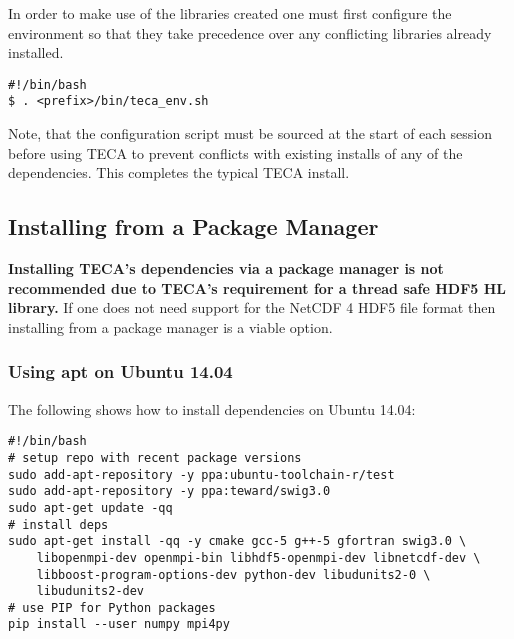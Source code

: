 \documentclass[a4paper,10pt,DIV=12]{scrreprt}
\begin{document}
\noindent In order to make use of the libraries created one
must first configure the environment so that they take precedence over any
conflicting libraries already installed.

\vspace{2mm}\hspace{0.2in}\begin{minipage}{0.8\textwidth}
\begin{verbatim}
#!/bin/bash
$ . <prefix>/bin/teca_env.sh
\end{verbatim}
\end{minipage}\vspace{2mm}

\noindent Note, that the configuration script must be sourced at the start of
each session before using TECA to prevent conflicts with existing installs of
any of the dependencies. This completes the typical TECA install.

\subsection{Installing from a Package Manager}
\textbf{ \color{red} Installing TECA's dependencies via a package manager is not
recommended due to TECA's requirement for a thread safe HDF5 HL library.} If one
does not need support for the NetCDF 4 HDF5 file format then installing from a
package manager is a viable option.

\subsubsection{Using apt on Ubuntu 14.04}
The following shows how to install dependencies on Ubuntu 14.04:

\vspace{2mm}\hspace{0.2in}\begin{minipage}{0.8\textwidth}
\begin{verbatim}
#!/bin/bash
# setup repo with recent package versions
sudo add-apt-repository -y ppa:ubuntu-toolchain-r/test
sudo add-apt-repository -y ppa:teward/swig3.0
sudo apt-get update -qq
# install deps
sudo apt-get install -qq -y cmake gcc-5 g++-5 gfortran swig3.0 \
    libopenmpi-dev openmpi-bin libhdf5-openmpi-dev libnetcdf-dev \
    libboost-program-options-dev python-dev libudunits2-0 \
    libudunits2-dev
# use PIP for Python packages
pip install --user numpy mpi4py
\end{verbatim}
\end{minipage}\vspace{2mm}
\end{document}
